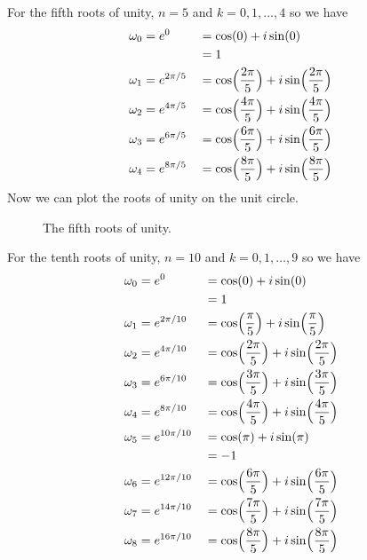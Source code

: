 \begin{exercise}
  For the fifth roots of unity, \(n = 5\) and \(k = 0,1,\ldots, 4\) so we have
  \begin{alignat*}{2}
    \omega_0 & = e^0 &&{}= \cos(0) + i\sin(0)\\
    & &&{}= 1\\
    \omega_1 & = e^{2\pi/5} &&{}=
    \cos\Bigl(\frac{2\pi}{5}\Bigr) + i\sin\Bigl(\frac{2\pi}{5}\Bigr)\\
    \omega_2 & = e^{4\pi/5} &&{}=
    \cos\Bigl(\frac{4\pi}{5}\Bigr) + i\sin\Bigl(\frac{4\pi}{5}\Bigr)\\
    \omega_3 & = e^{6\pi/5} &&{}=
    \cos\Bigl(\frac{6\pi}{5}\Bigr) + i\sin\Bigl(\frac{6\pi}{5}\Bigr)\\
    \omega_4 & = e^{8\pi/5} &&{}=
    \cos\Bigl(\frac{8\pi}{5}\Bigr) + i\sin\Bigl(\frac{8\pi}{5}\Bigr)\\
  \end{alignat*}
  Now we can plot the roots of unity on the unit circle.
  \begin{figure}[H]
    \centering
    
    \caption{The fifth roots of unity.}
  \end{figure}
  For the tenth roots of unity, \(n = 10\) and \(k = 0,1,\ldots, 9\) so we have
  \begin{alignat*}{2}
    \omega_0 & = e^0 &&{}= \cos(0) + i\sin(0)\\
    & &&{}= 1\\
    \omega_1 & = e^{2\pi/10} &&{}=
    \cos\Bigl(\frac{\pi}{5}\Bigr) + i\sin\Bigl(\frac{\pi}{5}\Bigr)\\
    \omega_2 & = e^{4\pi/10} &&{}=
    \cos\Bigl(\frac{2\pi}{5}\Bigr) + i\sin\Bigl(\frac{2\pi}{5}\Bigr)\\
    \omega_3 & = e^{6\pi/10} &&{}=
    \cos\Bigl(\frac{3\pi}{5}\Bigr) + i\sin\Bigl(\frac{3\pi}{5}\Bigr)\\
    \omega_4 & = e^{8\pi/10} &&{}=
    \cos\Bigl(\frac{4\pi}{5}\Bigr) + i\sin\Bigl(\frac{4\pi}{5}\Bigr)\\
    \omega_5 & = e^{10\pi/10} &&{}= \cos(\pi) + i\sin(\pi)\\
    & &&{}= -1\\
    \omega_6 & = e^{12\pi/10} &&{}=
    \cos\Bigl(\frac{6\pi}{5}\Bigr) + i\sin\Bigl(\frac{6\pi}{5}\Bigr)\\
    \omega_7 & = e^{14\pi/10} &&{}=
    \cos\Bigl(\frac{7\pi}{5}\Bigr) + i\sin\Bigl(\frac{7\pi}{5}\Bigr)\\
    \omega_8 & = e^{16\pi/10} &&{}=
    \cos\Bigl(\frac{8\pi}{5}\Bigr) + i\sin\Bigl(\frac{8\pi}{5}\Bigr)\\

\end{alignat*}
\end{exercise}
